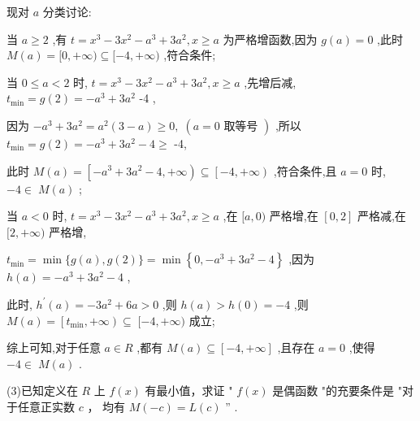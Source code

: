 \documentclass[10pt]{article}
\begin{document}
\begin{center}
\end{center}

现对 \(a\) 分类讨论:

当 \(a \geq  2\) ,有 \(t = {x}^{3} - 3{x}^{2} - {a}^{3} + 3{a}^{2},x \geq  a\) 为严格增函数,因为 \(g\left( a\right)  = 0\) ,此时 \(M\left( a\right)  = \lbrack 0, + \infty ) \subseteq  \lbrack  - 4, + \infty )\) ,符合条件;

当 \(0 \leq  a < 2\) 时, \(t = {x}^{3} - 3{x}^{2} - {a}^{3} + 3{a}^{2},x \geq  a\) ,先增后减, \({t}_{\min } = g\left( 2\right)  =  - {a}^{3} + 3{a}^{2}\) -4 ,

因为 \(- {a}^{3} + 3{a}^{2} = {a}^{2}\left( {3 - a}\right)  \geq  0,\;\left( {a = 0\text{ 取等号 }}\right)\) ,所以 \({t}_{\min } = g\left( 2\right)  =  - {a}^{3} + 3{a}^{2} - 4 \geq\) -4,

此时 \(M\left( a\right)  = \left\lbrack  {-{a}^{3} + 3{a}^{2} - 4, + \infty }\right)  \subseteq  \left\lbrack  {-4, + \infty }\right)\) ,符合条件,且 \(a = 0\) 时, \(- 4 \in \; M\left( a\right)\) ;

当 \(a < 0\) 时, \(t = {x}^{3} - 3{x}^{2} - {a}^{3} + 3{a}^{2},x \geq  a\) ,在 \(\lbrack a,0)\) 严格增,在 \(\left\lbrack  {0,2}\right\rbrack\) 严格减,在 \(\lbrack 2, + \infty )\) 严格增,

\({t}_{\min } = \min \{ g\left( a\right) ,g\left( 2\right) \}  = \min \left\{  {0, - {a}^{3} + 3{a}^{2} - 4}\right\}\) ,因为 \(h\left( a\right)  =  - {a}^{3} + 3{a}^{2} - 4\) ,

此时, \({h}^{\prime }\left( a\right)  =  - 3{a}^{2} + {6a} > 0\) ,则 \(h\left( a\right)  > h\left( 0\right)  =  - 4\) ,则 \(M\left( a\right)  = \left\lbrack  {{t}_{\min }, + \infty }\right)  \subseteq \; \lbrack  - 4, + \infty )\) 成立;

综上可知,对于任意 \(a \in  R\) ,都有 \(M\left( a\right)  \subseteq  \left\lbrack  {-4, + \infty }\right\rbrack\) ,且存在 \(a = 0\) ,使得 \(- 4 \in \; M\left( a\right)\) .

(3)已知定义在 \(R\) 上 \(f\left( x\right)\) 有最小值，求证 " \(f\left( x\right)\) 是偶函数 "的充要条件是 "对于任意正实数 \(c\) ， 均有 \(M\left( {-c}\right)  = L\left( c\right)\) ” .
\end{document}
